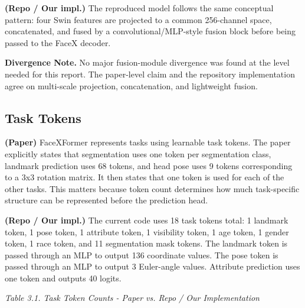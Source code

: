 \documentclass[11pt]{article}
\begin{document}
\textbf{(Repo / Our impl.)} The reproduced model follows the same conceptual pattern: four Swin features are projected to a common 256-channel space, concatenated, and fused by a convolutional/MLP-style fusion block before being passed to the FaceX decoder.


\textbf{Divergence Note.} No major fusion-module divergence was found at the level needed for this report. The paper-level claim and the repository implementation agree on multi-scale projection, concatenation, and lightweight fusion.


\subsection{Task Tokens}


\textbf{(Paper)} FaceXFormer represents tasks using learnable task tokens. The paper explicitly states that segmentation uses one token per segmentation class, landmark prediction uses 68 tokens, and head pose uses 9 tokens corresponding to a 3x3 rotation matrix. It then states that one token is used for each of the other tasks. This matters because token count determines how much task-specific structure can be represented before the prediction head.


\textbf{(Repo / Our impl.)} The current code uses 18 task tokens total: 1 landmark token, 1 pose token, 1 attribute token, 1 visibility token, 1 age token, 1 gender token, 1 race token, and 11 segmentation mask tokens. The landmark token is passed through an MLP to output 136 coordinate values. The pose token is passed through an MLP to output 3 Euler-angle values. Attribute prediction uses one token and outputs 40 logits.


\emph{Table 3.1. Task Token Counts - Paper vs. Repo / Our Implementation}
\end{document}
